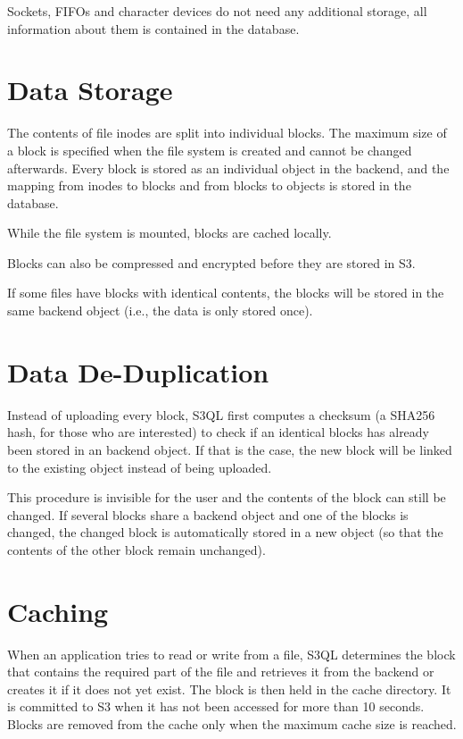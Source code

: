 \documentclass[letterpaper,10pt,english]{sphinxmanual}
\begin{document}
Sockets, FIFOs and character devices do not need any additional
storage, all information about them is contained in the database.


\section{Data Storage}
\label{impl_details:data-storage}
The contents of file inodes are split into individual blocks. The
maximum size of a block is specified when the file system is created
and cannot be changed afterwards. Every block is stored as an
individual object in the backend, and the mapping from inodes to
blocks and from blocks to objects is stored in the database.

While the file system is mounted, blocks are cached locally.

Blocks can also be compressed and encrypted before they are stored in
S3.

If some files have blocks with identical contents, the blocks will be
stored in the same backend object (i.e., the data is only stored
once).


\section{Data De-Duplication}
\label{impl_details:data-de-duplication}
Instead of uploading every block, S3QL first computes a checksum (a
SHA256 hash, for those who are interested) to check if an identical
blocks has already been stored in an backend object. If that is the
case, the new block will be linked to the existing object instead of
being uploaded.

This procedure is invisible for the user and the contents of the block
can still be changed. If several blocks share a backend object and one
of the blocks is changed, the changed block is automatically stored in
a new object (so that the contents of the other block remain
unchanged).


\section{Caching}
\label{impl_details:caching}
When an application tries to read or write from a file, S3QL
determines the block that contains the required part of the file and
retrieves it from the backend or creates it if it does not yet exist.
The block is then held in the cache directory. It is committed to S3
when it has not been accessed for more than 10 seconds. Blocks are
removed from the cache only when the maximum cache size is reached.
\end{document}
